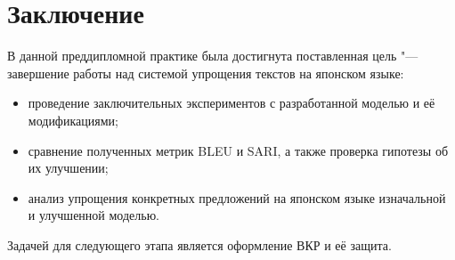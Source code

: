 \chapter*{Заключение} \label{ch-conclusion}

В данной преддипломной практике была достигнута поставленная цель "--- завершение работы над системой упрощения текстов на японском языке:
\begin{itemize}%
  \item проведение заключительных экспериментов с разработанной моделью и её модификациями;
  \item сравнение полученных метрик BLEU и SARI, а также проверка гипотезы об их улучшении;
  \item анализ упрощения конкретных предложений на японском языке изначальной и улучшенной моделью.
\end{itemize}

Задачей для следующего этапа является оформление ВКР и её защита.
